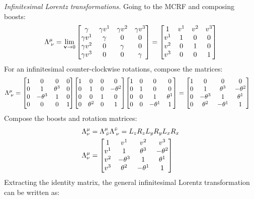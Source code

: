 \documentclass{report}
\begin{document}
\begin{subquests}
	\item \emph	{Infinitesimal Lorentz transformations.}
	Going to the MCRF and composing boosts:
	\begin{gather*}
		\Lambda^{\mu}_{\;\nu} = \lim_{{\vb v}\to 0}\mqty[
			\gamma & \gamma v^1 & \gamma v^2 & \gamma v^3 \\
			\gamma v^1 & \gamma & 0 & 0 \\
			\gamma v^2 & 0 & \gamma & 0 \\
			\gamma v^3 & 0 & 0 & \gamma
		] = \mqty[
			1 &  v^1 &  v^2 &  v^3 \\
			v^1 & 1 & 0 & 0 \\
			v^2 & 0 & 1 & 0 \\
			v^3 & 0 & 0 & 1
		]
	\end{gather*}
	For an infinitesimal counter-clockwise rotations, compose the matrices:
	\begin{align*}
		\Lambda^{\mu}_{\;\nu} & = \mqty[
			1 & 0 & 0 & 0 \\
			0 & 1 & \theta^3 & 0 \\
			0 & -\theta^3 & 1 & 0\\
			0 & 0 & 0 & 1
		]
		\mqty[
			1 & 0 & 0 & 0 \\
			0 & 1 & 0 & -\theta^2 \\
			0 & 0 & 1 & 0 \\
			0 & \theta^2 & 0 & 1
		]
		\mqty[
			1 & 0 & 0 & 0 \\
			0 & 1 & 0 & 0 \\
			0 & 0 & 1 & \theta^1 \\
			0 & 0 & -\theta^1 & 1
		] = \mqty[
			1 & 0 & 0 & 0 \\
			0 & 1 & \theta^3 & -\theta^2 \\
			0 & -\theta^3 & 1 & \theta^1 \\
			0 & \theta^2 & -\theta^1 & 1
		]
	\end{align*}
	Compose the boosts and rotation matrices:
	\begin{align*}
		\Lambda^{\mu}_{\nu} & = \Lambda^{\mu}_{\;\bar{\nu}}\Lambda^{\bar{\nu}}_{\;\nu} = 
		L_z R_z L_y R_y L_x R_x \\
		\Lambda^{\mu}_{\nu} & = 
		\mqty[
			1 & v^1 & v^2 & v^3 \\
			v^1 & 1 & \theta^3 & -\theta^2 \\
			v^2 & -\theta^3 & 1 & \theta^1 \\
			v^3 & \theta^2 & -\theta^1 & 1
		]
	\end{align*}
	Extracting the identity matrix, the general infinitesimal Lorentz transformation can be written as:

\end{subquests}
\end{document}
